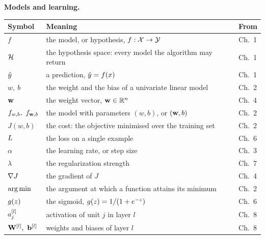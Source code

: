 \vspace{6pt}
\noindent\textbf{Models and learning.}
\begin{center}
\small
\renewcommand{\arraystretch}{1.25}
\begin{tabular}{@{}L{2.6cm}L{7.4cm}L{1.6cm}@{}}
\toprule
\textbf{Symbol} & \textbf{Meaning} & \textbf{From}\\
\midrule
$f$                 & the model, or hypothesis, $f:\mathcal{X}\to\mathcal{Y}$ & Ch.\ 1\\
$\mathcal{H}$           & the hypothesis space: every model the algorithm may return & Ch.\ 1\\
$\hat{y}$             & a prediction, $\hat{y}=f(x)$ & Ch.\ 1\\
$w,\ b$             & the weight and the bias of a univariate linear model & Ch.\ 2\\
$\mathbf{w}$               & the weight vector, $\mathbf{w}\in\mathbb{R}^{n}$ & Ch.\ 4\\
$f_{w,b},\ f_{\mathbf{w},b}$      & the model with parameters $(w,b)$, or $(\mathbf{w},b)$ & Ch.\ 2\\
$J(w,b)$            & the cost: the objective minimised over the training set & Ch.\ 2\\
$L$             & the loss on a single example & Ch.\ 6\\
$\alpha$            & the learning rate, or step size & Ch.\ 3\\
$\lambda$           & the regularization strength & Ch.\ 7\\
$\nabla J$           & the gradient of $J$ & Ch.\ 4\\
$\operatorname*{arg\,min}$           & the argument at which a function attains its minimum & Ch.\ 2\\
$g(z)$          & the sigmoid, $g(z)=1/(1+e^{-z})$ & Ch.\ 6\\
$a^{[l]}_{j}$         & activation of unit $j$ in layer $l$ & Ch.\ 8\\
$\mathbf{W}^{[l]},\ \mathbf{b}^{[l]}$   & weights and biases of layer $l$ & Ch.\ 8\\
\bottomrule
\end{tabular}
\end{center}


